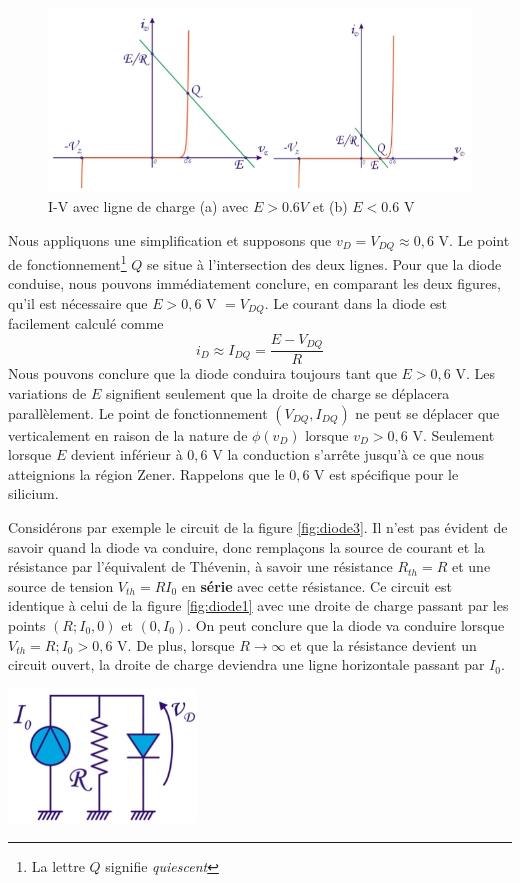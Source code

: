 \begin{figure}[h!]
	\centering
	\includegraphics[width=12cm]{figures/ch02/diode2.jpg}
	\caption{I-V avec ligne de charge (a) avec $E > 0.6 V$ et (b) $E < 0.6$ V}
	\label{fig:diode2}
\end{figure}
Nous appliquons une simplification et supposons que $v_D = V_{DQ} \approx 0,6$ V. Le point de fonctionnement\footnote{La lettre $Q$ signifie \emph{quiescent}} $Q$ se situe à l'intersection des deux lignes. Pour que la diode conduise, nous pouvons immédiatement conclure, en comparant les deux figures, qu'il est nécessaire que $E > 0,6$ V $= V_{DQ}$. Le courant dans la diode est facilement calculé comme
$$
i_D \approx I_{DQ} = \frac{E - V_{DQ}}{R}
$$
Nous pouvons conclure que la diode conduira toujours tant que $E > 0,6$ V. Les variations de $E$ signifient seulement que la droite de charge se déplacera parallèlement. Le point de fonctionnement $(V_{DQ}, I_{DQ})$ ne peut se déplacer que verticalement en raison de la nature de $\phi(v_D)$ lorsque $v_D > 0,6$ V. Seulement lorsque $E$ devient inférieur à $0,6$ V la conduction s'arrête jusqu'à ce que nous atteignions la région Zener. Rappelons que le $0,6$ V est spécifique pour le silicium.\\

\begin{minipage}{.6\textwidth}
	Considérons par exemple le circuit de la figure \ref{fig:diode3}. Il n'est pas évident de savoir quand la diode va conduire, donc remplaçons la source de courant et la résistance par l'équivalent de Thévenin, à savoir une résistance $R_{th} = R$ et une source de tension $V_{th} = R I_0$ en \textbf{série} avec cette résistance. Ce circuit est identique à celui de la figure \ref{fig:diode1} avec une droite de charge passant par les points $(R;I_0, 0)$ et $(0, I_0)$. On peut conclure que la diode va conduire lorsque $V_{th} = R;I_0 > 0,6$ V. De plus, lorsque $R\rightarrow \infty$ et que la résistance devient un circuit ouvert, la droite de charge deviendra une ligne horizontale passant par $I_0$.
\end{minipage}
\begin{minipage}{.5\textwidth}
	\centering
	\includegraphics[width=5cm]{figures/ch02/diode3.jpg}
	\label{fig:diode3}
\end{minipage}%

